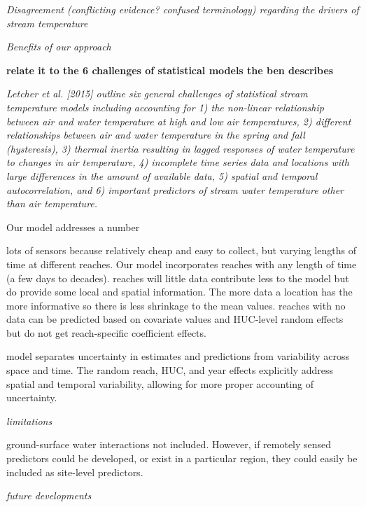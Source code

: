 \emph{Disagreement (conflicting evidence? confused terminology)
regarding the drivers of stream temperature}

\emph{Benefits of our approach}

\textbf{relate it to the 6 challenges of statistical models the ben
describes}

\emph{Letcher et al. {[}2015{]} outline six general challenges of
statistical stream temperature models including accounting for 1) the
non-linear relationship between air and water temperature at high and
low air temperatures, 2) different relationships between air and water
temperature in the spring and fall (hysteresis), 3) thermal inertia
resulting in lagged responses of water temperature to changes in air
temperature, 4) incomplete time series data and locations with large
differences in the amount of available data, 5) spatial and temporal
autocorrelation, and 6) important predictors of stream water temperature
other than air temperature.}

Our model addresses a number

lots of sensors because relatively cheap and easy to collect, but
varying lengths of time at different reaches. Our model incorporates
reaches with any length of time (a few days to decades). reaches will
little data contribute less to the model but do provide some local and
spatial information. The more data a location has the more informative
so there is less shrinkage to the mean values. reaches with no data can
be predicted based on covariate values and HUC-level random effects but
do not get reach-specific coefficient effects.

model separates uncertainty in estimates and predictions from
variability across space and time. The random reach, HUC, and year
effects explicitly address spatial and temporal variability, allowing
for more proper accounting of uncertainty.

\emph{limitations}

ground-surface water interactions not included. However, if remotely
sensed predictors could be developed, or exist in a particular region,
they could easily be included as site-level predictors.

\emph{future developments}

